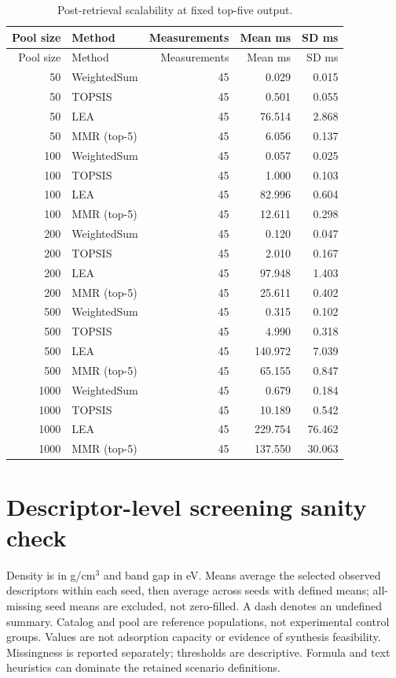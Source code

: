 \documentclass[11pt,a4paper]{article}
\begin{document}
\begin{footnotesize}\begin{longtable}{rlrrr}
\caption{Post-retrieval scalability at fixed top-five output.}\\
\toprule
Pool size & Method & Measurements & Mean ms & SD ms\\\midrule\endfirsthead
\toprule Pool size & Method & Measurements & Mean ms & SD ms\\\midrule\endhead
50 & WeightedSum & 45 & 0.029 & 0.015\\
50 & TOPSIS & 45 & 0.501 & 0.055\\
50 & LEA & 45 & 76.514 & 2.868\\
50 & MMR (top-5) & 45 & 6.056 & 0.137\\
100 & WeightedSum & 45 & 0.057 & 0.025\\
100 & TOPSIS & 45 & 1.000 & 0.103\\
100 & LEA & 45 & 82.996 & 0.604\\
100 & MMR (top-5) & 45 & 12.611 & 0.298\\
200 & WeightedSum & 45 & 0.120 & 0.047\\
200 & TOPSIS & 45 & 2.010 & 0.167\\
200 & LEA & 45 & 97.948 & 1.403\\
200 & MMR (top-5) & 45 & 25.611 & 0.402\\
500 & WeightedSum & 45 & 0.315 & 0.102\\
500 & TOPSIS & 45 & 4.990 & 0.318\\
500 & LEA & 45 & 140.972 & 7.039\\
500 & MMR (top-5) & 45 & 65.155 & 0.847\\
1000 & WeightedSum & 45 & 0.679 & 0.184\\
1000 & TOPSIS & 45 & 10.189 & 0.542\\
1000 & LEA & 45 & 229.754 & 76.462\\
1000 & MMR (top-5) & 45 & 137.550 & 30.063\\
\bottomrule\end{longtable}\end{footnotesize}
\section*{Descriptor-level screening sanity check}
Density is in g/cm$^3$ and band gap in eV. Means average the selected observed descriptors within each seed, then average across seeds with defined means; all-missing seed means are excluded, not zero-filled. A dash denotes an undefined summary. Catalog and pool are reference populations, not experimental control groups. Values are not adsorption capacity or evidence of synthesis feasibility. Missingness is reported separately; thresholds are descriptive. Formula and text heuristics can dominate the retained scenario definitions.
\end{document}
